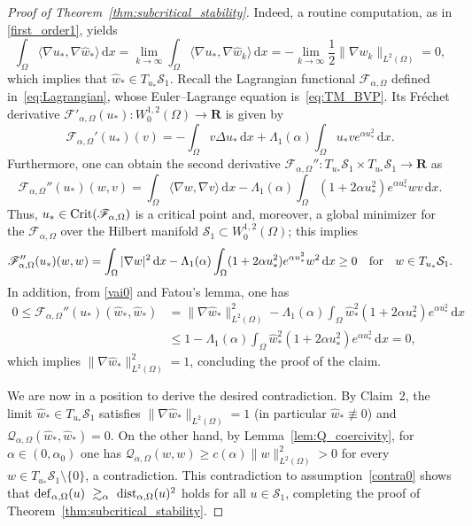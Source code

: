 \documentclass[reqno,11pt]{amsart}
\theoremstyle{definition}
\newcommand{\ud}{\,\mathrm{d}}
\begin{document}
\begin{proof}[Proof of Theorem~\ref{thm:subcritical_stability}]
    \noindent Indeed, a routine computation, as in \eqref{first_order1}, yields
	\[
	\int_\Omega \langle \nabla  u_*,  \nabla  \widehat{w}_*\rangle \ud x=\lim_{k\rightarrow \infty}\int_\Omega  \langle \nabla  u_* ,\nabla \widehat{w}_k\rangle \ud x= -\lim_{k\rightarrow \infty}\frac{1}{2}\|{\nabla w_k}\|_{L^2(\Omega)} = 0,
	\]
	which implies that $\widehat{w}_*\in T_{u_*}\mathcal{S}_1$. 
    Recall the Lagrangian functional $\mathscr{F}_{\alpha,\Omega}$ defined in~\eqref{eq:Lagrangian}, whose Euler--Lagrange equation is~\eqref{eq:TM_BVP}. Its Fréchet derivative
    $\mathscr{F}'_{\alpha,\Omega}(u_*):W^{1,2}_0(\Omega)\to \mathbf{R}$ is given by
    \[
    \mathscr{F}_{\alpha,\Omega}'(u_*)(v)=-\int_{\Omega}  v\Delta u_*   \ud x +\Lambda_1(\alpha) \int_{\Omega} u_*ve^{\alpha u_*^2} \ud x.
    \]
	Furthermore, one can obtain the second derivative $\mathscr{F}_{\alpha,\Omega}'':T_{u_*}\mathcal{S}_1\times T_{u_*}\mathcal{S}_1\to \mathbf{R}$ as
	\[
	\mathscr{F}_{\alpha,\Omega}''(u_*)(w,v)= \int_{\Omega}  \langle \nabla  w, \nabla  v \rangle \ud x- \Lambda_1(\alpha) \int_{\Omega} (1 + 2\alpha u_*^2) e^{\alpha u_*^2} wv \ud x.
	\]
	Thus, $u_*\in {\rm Crit}(\mathscr{F}_{\alpha,\Omega})$ is a critical point and, moreover, a global minimizer for the $\mathscr{F}_{\alpha,\Omega}$ over the Hilbert manifold $\mathcal{S}_1\subset W^{1,2}_0(\Omega)$; this implies 
	\begin{equation}\label{positiv}
		\mathscr{F}_{\alpha,\Omega}''(u_*)(w,w)= \int_{\Omega}|\nabla w|^2\ud x- \Lambda_1(\alpha) \int_{\Omega} (1 + 2\alpha u_*^2) e^{\alpha u_*^2} w^2 \ud x\geq 0 \quad {\rm for} \quad  w\in T_{u_*} \mathcal{S}_1.
	\end{equation}
    In addition, from  \eqref{vai0} and Fatou's lemma, one has
    \[
    \begin{aligned}
    0\leq \mathscr{F}_{\alpha,\Omega}''(u_*)(\widehat{w}_*,\widehat{w}_*)&= \|{\nabla  \widehat{w}_*}\|^2_{L^2(\Omega)}- \Lambda_1(\alpha) \int_\Omega \widehat{w}_*^2(1+2\alpha u_*^2)
    e^{\alpha u_*^2} \ud x\\
    &\leq 1
    - \Lambda_1(\alpha) \int_\Omega \widehat{w}_*^2(1+2\alpha u_*^2)
    e^{\alpha u_*^2} \ud x=0,
    \end{aligned}
    \]
    which implies $\|{\nabla  \widehat{w}_*}\|^2_{L^2(\Omega)}=1$, concluding the proof of the claim.


    We are now in a position to derive the desired contradiction.
    By Claim~2, the limit $\widehat{w}_*\in T_{u_*}\mathcal{S}_1$
    satisfies $\|\nabla\widehat{w}_*\|_{L^2(\Omega)}=1$ (in particular $\widehat{w}_*\not\equiv0$) and
    $\mathscr{Q}_{\alpha,\Omega}(\widehat{w}_*,\widehat{w}_*)=0$.
    On the other hand, by Lemma~\ref{lem:Q_coercivity},
    for $\alpha\in(0,\alpha_0)$ one has
    $\mathscr{Q}_{\alpha,\Omega}(w,w)\ge c(\alpha)\|w\|_{L^2(\Omega)}^2>0$
    for every $w\in T_{u_*}\mathcal{S}_1\setminus\{0\}$,
    a contradiction.
    This contradiction to assumption~\eqref{contra0} shows that
    \({\rm def}_{\alpha,\Omega}(u)\ \gtrsim_\alpha\ {\rm dist}_{\alpha,\Omega}(u)^2\)
    holds for all $u\in\mathcal{S}_1$, completing the proof of Theorem~\ref{thm:subcritical_stability}.
    \end{proof}
    
\end{document}
